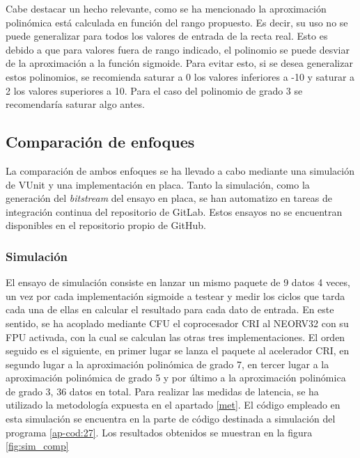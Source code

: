Cabe destacar un hecho relevante, como se ha mencionado la aproximación polinómica está calculada en función del rango propuesto.
Es decir, su uso no se puede generalizar para todos los valores de entrada de la recta real.
Esto es debido a que para valores fuera de rango indicado, el polinomio se puede desviar de la aproximación a la función sigmoide.
Para evitar esto, si se desea generalizar estos polinomios, se recomienda saturar a 0 los valores inferiores a -10  y saturar a 2 los valores superiores a 10. 
Para el caso del polinomio de grado 3 se recomendaría saturar algo antes.

\subsection{Comparación de enfoques}

La comparación de ambos enfoques se ha llevado a cabo mediante una simulación de VUnit  y una implementación en placa.
Tanto la simulación, como la generación del \textit{bitstream} del ensayo en placa, se han automatizo en tareas de integración continua del repositorio de GitLab.
Estos ensayos no se encuentran disponibles en el repositorio propio de GitHub.

\subsubsection{Simulación}

El ensayo de simulación consiste en lanzar un mismo paquete de 9 datos 4 veces, un vez por cada implementación sigmoide a testear y medir los ciclos que tarda cada una de ellas en calcular el resultado para cada dato de entrada.
En este sentido, se ha acoplado mediante CFU el coprocesador CRI al NEORV32 con su FPU activada, con la cual se calculan las otras tres implementaciones.
El orden seguido es el siguiente, en primer lugar se lanza el paquete al acelerador CRI, en segundo lugar a la aproximación polinómica de grado 7, en tercer lugar a la aproximación polinómica de grado 5 y por último a la aproximación polinómica de grado 3, 36 datos en total.
Para realizar las medidas de latencia, se ha utilizado la metodología expuesta en el apartado \ref{met}.
El código empleado en esta simulación se encuentra en la parte de código destinada a simulación del programa \ref{ap-cod:27}.
Los resultados obtenidos se muestran en la figura \ref{fig:sim_comp}

